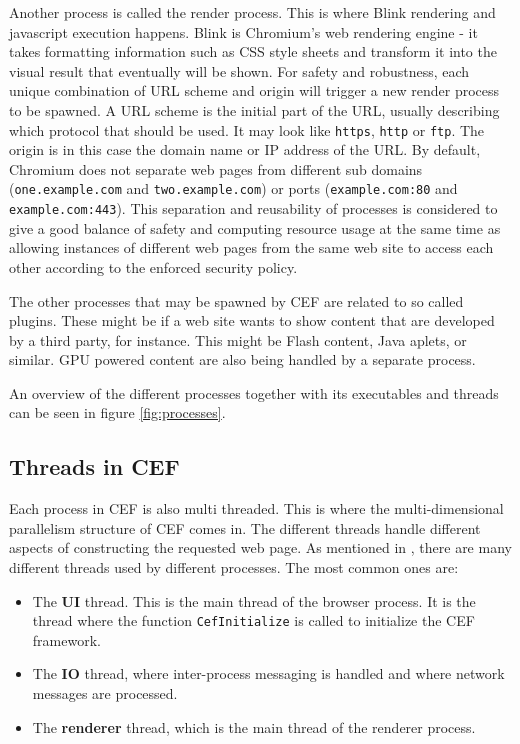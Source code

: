 Another process is called the render process. This is where Blink rendering and javascript execution happens. Blink is Chromium's web rendering engine - it takes formatting information such as CSS style sheets and transform it into the visual result that eventually will be shown. \cite{blink} For safety and robustness, each unique combination of URL scheme and origin will trigger a new render process to be spawned. A URL scheme is the initial part of the URL, usually describing which protocol that should be used. It may look like \texttt{https}, \texttt{http} or \texttt{ftp}. The origin is in this case the domain name or IP address of the URL. By default, Chromium does not separate web pages from different sub domains (\texttt{one.example.com} and \texttt{two.example.com}) or ports (\texttt{example.com:80} and \texttt{example.com:443}). \cite{processes} This separation and reusability of processes is considered to give a good balance of safety and computing resource usage at the same time as allowing instances of different web pages from the same web site to access each other according to the enforced security policy. \cite{network10same}

The other processes that may be spawned by CEF are related to so called plugins. These might be if a web site wants to show content that are developed by a third party, for instance. This might be Flash content, Java aplets, or similar. GPU powered content are also being handled by a separate process.

An overview of the different processes together with its executables and threads can be seen in figure \ref{fig:processes}.

\subsection{Threads in CEF}

Each process in CEF is also multi threaded. This is where the multi-dimensional parallelism structure of CEF comes in. The different threads handle different aspects of constructing the requested web page. As mentioned in \cite{cefusage}, there are many different threads used by different processes. The most common ones are:

\begin{itemize}
  \item The \textbf{UI} thread. This is the main thread of the browser process. It is the thread where the function \texttt{CefInitialize} is called to initialize the CEF framework.
  \item The \textbf{IO} thread, where inter-process messaging is handled and where network messages are processed.
  \item The \textbf{renderer} thread, which is the main thread of the renderer process.
\end{itemize}

